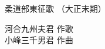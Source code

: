 \documentclass[10pt,b5j]{tarticle} %
\begin{document}
\begin{minipage}[c]{0.7\hsize} %
    \begin{center}
        {\LARGE
            柔道部東征歌 %
        }
        {\small 
            （大正末期） %
        }
    \end{center}
\end{minipage}
\begin{minipage}[c]{0.3\hsize} %
    \begin{flushright} %
        河合九州夫君 作歌\\小峰三千男君 作曲 %
    \end{flushright}
\end{minipage}
\end{document}
